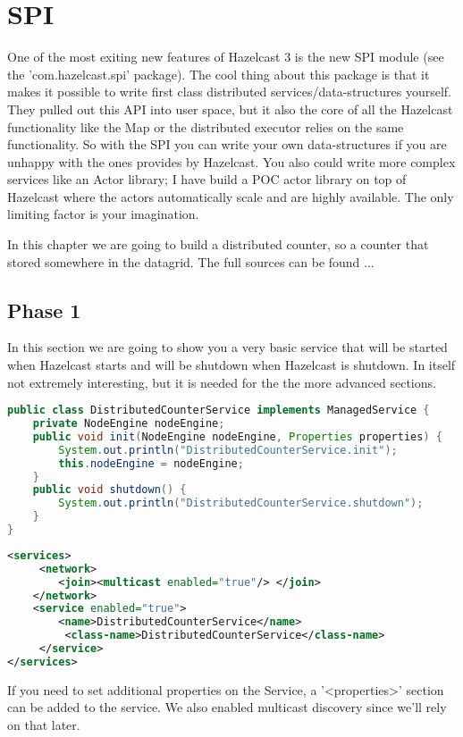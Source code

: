 \chapter{SPI}

One of the most exiting new features of Hazelcast 3 is the new SPI module (see the 'com.hazelcast.spi' package). The cool thing about this package is that it makes it possible to write first class distributed services/data-structures yourself. They pulled out this API into user space, but it also the core of all the Hazelcast functionality like the Map or the distributed executor relies on the same functionality. So with the SPI you can write your own data-structures if you are unhappy with the ones provides by Hazelcast. You also could write more complex services like an Actor library; I have build a POC actor library on top of Hazelcast where the actors automatically scale and are highly available. The only limiting factor is your imagination.

In this chapter we are going to build a distributed counter, so a counter that stored somewhere in the datagrid. The full sources can be found ...

\section{Phase 1}
In this section we are going to show you a very basic service that will be started when Hazelcast starts and will be shutdown when Hazelcast is shutdown. In itself not extremely interesting, but it is needed for the the more advanced sections.

\begin{lstlisting}[language=java]
public class DistributedCounterService implements ManagedService {
    private NodeEngine nodeEngine;
    public void init(NodeEngine nodeEngine, Properties properties) {
        System.out.println("DistributedCounterService.init");
        this.nodeEngine = nodeEngine;
    }
    public void shutdown() {
        System.out.println("DistributedCounterService.shutdown");
    }
}
\end{lstlisting}

\begin{lstlisting}[language=xml]
<services>
     <network>
        <join><multicast enabled="true"/> </join>
    </network>
    <service enabled="true">
        <name>DistributedCounterService</name>
         <class-name>DistributedCounterService</class-name>
     </service>
</services>
\end{lstlisting}
If you need to set additional properties on the Service, a '<properties>' section can be added to the service. We also enabled multicast discovery since we'll rely on that later.

